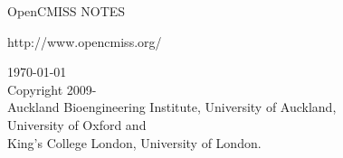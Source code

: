 \thispagestyle{empty}

\begin{center}
   \huge OpenCMISS NOTES
   \vspace{10mm}   

   \large http://www.opencmiss.org/

   \vspace{40mm}   

   \vspace{5mm}
   \today\\   %
   \vspace{20mm}
   \small
   \textcopyright \thickspace Copyright 2009-\\
   Auckland Bioengineering Institute, University of Auckland, \\
   University of Oxford and \\
   King's College London, University of London.
\end{center}





